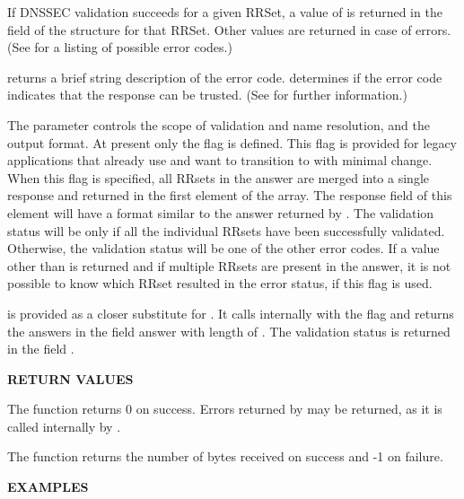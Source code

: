 If DNSSEC validation succeeds for a given RRSet, a value of
 is returned in the  field of the
 structure for that RRSet.  Other values are returned in
case of errors.  (See  for a listing of possible error
codes.)

 returns a brief string description of the error
code.   determines if the error code indicates that the
response can be trusted.  (See  for further information.)

The  parameter controls the scope of validation and name
resolution, and the output format.  At present only the
 flag is defined.  This flag is provided for
legacy applications that already use  and want to
transition to  with minimal change.  When this flag is
specified, all RRsets in the answer are merged into a single response and
returned in the first element of the  array.  The response field of
this element will have a format similar to the answer returned by
.  The validation status will be  only
if all the individual RRsets have been successfully validated.  Otherwise, the
validation status will be one of the other error codes.  If a value other than
 is returned and if multiple RRsets are present in the
answer, it is not possible to know which RRset resulted in the error status,
if this flag is used.

 is provided as a closer substitute for
.  It calls  internally with the
 flag and returns the answers in the field
answer with length of .  The validation status is returned in the
field .

{\bf RETURN VALUES}

The  function returns 0 on success.  Errors returned
by  may be returned, as it is called internally
by .

The  function returns the number of bytes received on
success and -1 on failure.

{\bf EXAMPLES}


